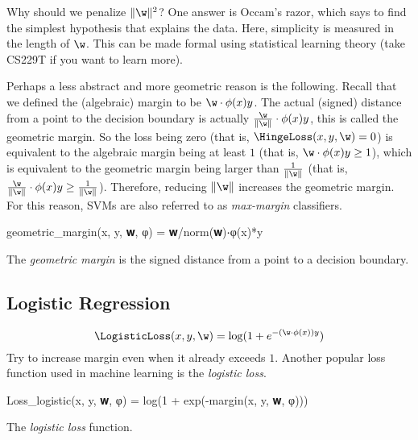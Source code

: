 Why should we penalize $\|\w\|^2$?  One answer is Occam's razor, which says to find the simplest hypothesis that explains the data.
Here, simplicity is measured in the length of $\w$.  This can be made formal using statistical learning theory (take CS229T if you want to learn more).

Perhaps a less abstract and more geometric reason is the following.
Recall that we defined the (algebraic) margin to be $\w \cdot \phi(x) y$.
The actual (signed) distance from a point to the decision boundary
is actually $\frac{\w}{\|\w\|} \cdot \phi(x) y$, this is called the geometric margin.
So the loss being zero (that is, $\HingeLoss(x,y,\w) = 0$) is equivalent to
the algebraic margin being at least $1$ (that is, $\w \cdot \phi(x) y \ge 1$),
which is equivalent to the geometric margin being larger than $\frac1{\|\w\|}$ (that is, $\frac{\w}{\|\w\|} \cdot \phi(x) y \ge \frac1{\|\w\|}$).
Therefore, reducing $\|\w\|$ increases the geometric margin.
For this reason, SVMs are also referred to as \textit{max-margin} classifiers.
\begin{algorithm}
\begin{juliaverbatim}
geometric_margin(x, y, 𝐰, φ) = 𝐰/norm(𝐰)⋅φ(x)*y
\end{juliaverbatim}

\caption{
    \label{alg:geometric_margin}
    The \textit{geometric margin} is the signed distance from a point to a decision boundary.
}
\end{algorithm}

\subsection{Logistic Regression} %
\label{sub:logistic_regression}
\[
    \LogisticLoss(x, y, \w) = \log(1 + e^{-(\w \cdot \phi(x)) y})
\]
Try to increase margin even when it already exceeds $1$.
% 
Another popular loss function used in machine learning is the \textit{logistic loss}.
\begin{algorithm}
\begin{juliaverbatim}
Loss_logistic(x, y, 𝐰, φ) = log(1 + exp(-margin(x, y, 𝐰, φ)))
\end{juliaverbatim}

\caption{
    \label{alg:logistic_locc}
    The \textit{logistic loss} function.
}
\end{algorithm}

